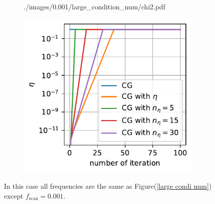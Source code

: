 \documentclass[11pt, letterpaper]{article}
\begin{document}
\begin{figure}[htb]
\begin{subfigure}{0.33\textwidth}
        {./images/0.001/large_condition_num/chi2.pdf}
    \caption{}
    \label{large condi num chi2 0.001}
\end{subfigure}%
\begin{subfigure}{0.33\textwidth}
    \centering
    \includegraphics[width=\linewidth]
        {./images/0.001/large_condition_num/eta.pdf}
    \caption{}
    \label{large condi num eta 0.001}
\end{subfigure}
\caption{In this case all frequencies are the same as
    Figure(\ref{large condi num}) except $f_{\text{scan}} = 0.001$.
}
\label{large condi num 0.001}
\end{figure}
\end{document}
